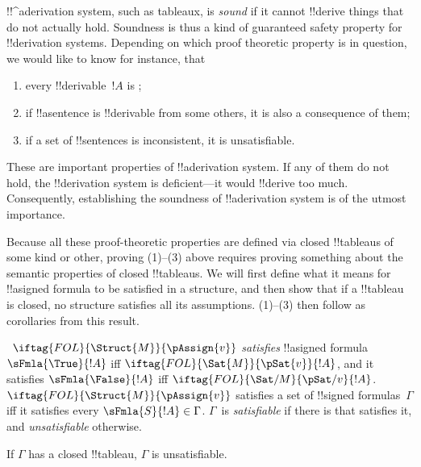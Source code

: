 \documentclass[../../../include/open-logic-section]{subfiles}
\begin{document}
      {}
      {}
      

\begin{explain}
!!^a{derivation} system, such as tableaux, is \emph{sound}
if it cannot !!{derive} things that do not actually hold.  Soundness is
thus a kind of guaranteed safety property for !!{derivation} systems.
Depending on which proof theoretic property is in question, we would
like to know for instance, that
\begin{enumerate}
\item every !!{derivable}~$!A$ is ;
\item if !!a{sentence} is !!{derivable} from some others, it is also a
  consequence of them;
\item if a set of !!{sentence}s is inconsistent, it is unsatisfiable.
\end{enumerate}
These are important properties of !!a{derivation} system.  If any of them do
not hold, the !!{derivation} system is deficient---it would !!{derive} too much.
Consequently, establishing the soundness of !!a{derivation} system is of the
utmost importance.

Because all these proof-theoretic properties are defined via closed
!!{tableau}s of some kind or other, proving (1)--(3) above requires
proving something about the semantic properties of closed
!!{tableau}s.  We will first define what it means for !!a{signed
  formula} to be satisfied in a structure, and then show that if a
!!{tableau} is closed, no structure satisfies all its assumptions.
(1)--(3) then follow as corollaries from this result.
\end{explain}

\begin{defn}
~$\iftag{FOL}{\Struct{M}}{\pAssign{v}}$
\emph{satisfies} !!a{signed formula} $\sFmla{\True}{!A}$ iff
$\iftag{FOL}{\Sat{M}}{\pSat{v}}{!A}$, and it satisfies
$\sFmla{\False}{!A}$ iff
$\iftag{FOL}{\Sat/{M}}{\pSat/{v}}{!A}$. $\iftag{FOL}{\Struct{M}}{\pAssign{v}}$
satisfies a set of !!{signed formula}s~$\Gamma$ iff it satisfies every
$\sFmla{S}{!A} \in \Gamma$. $\Gamma$~is \emph{satisfiable} if there is
 that satisfies it, and
\emph{unsatisfiable} otherwise.
\end{defn}

\begin{thm}[Soundness]
  If $\Gamma$ has a closed !!{tableau}, $\Gamma$ is unsatisfiable.
\end{thm}
\end{document}
